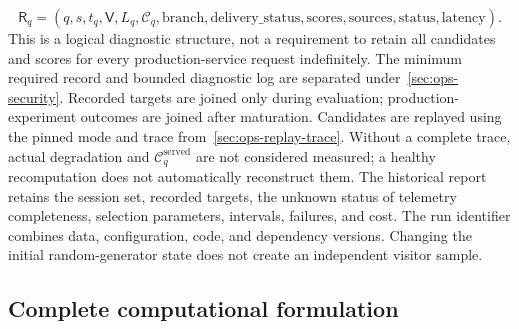 \documentclass[12pt,a4paper]{article}
\theoremstyle{plainru}
\begin{document}
\begin{equation}\label{eq:acceptance-request-result}
\mathsf R_q=(q,s,t_q,\mathsf V,L_q,\mathcal C_q,
\mathrm{branch},\mathrm{delivery\_status},
\mathrm{scores},\mathrm{sources},\mathrm{status},\mathrm{latency}).
\end{equation}
This is a logical diagnostic structure, not a requirement to retain
all candidates and scores for every production-service request indefinitely.
The minimum required record and bounded diagnostic log
are separated under~\ref{sec:ops-security}. Recorded targets are joined
only during evaluation; production-experiment outcomes are joined after maturation.
Candidates are replayed using the pinned mode
and trace from~\ref{sec:ops-replay-trace}. Without a complete trace, actual
degradation and $\mathcal C_q^{\mathrm{served}}$ are not considered measured;
a healthy recomputation does not automatically reconstruct them.
The historical report retains the session set, recorded targets,
the unknown status of telemetry completeness, selection parameters,
intervals, failures, and cost. The run identifier combines data,
configuration, code, and dependency versions. Changing the initial random-generator
state does not create an independent visitor sample.

\subsection{Complete computational formulation}
\end{document}
